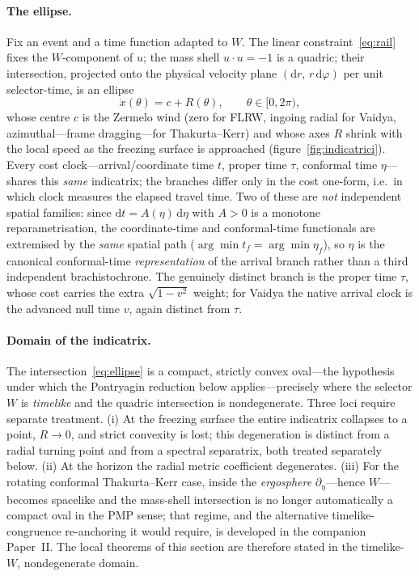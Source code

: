 \documentclass[12pt]{iopart}
\newcommand{\dd}{\mathrm{d}}
\theoremstyle{plain}
\theoremstyle{definition}
\theoremstyle{plain}
\theoremstyle{remark}
\begin{document}
\paragraph{The ellipse.} Fix an event and a time function adapted to $W$. The
linear constraint~\eqref{eq:rail} fixes the $W$-component of $u$; the mass shell
$u\cdot u=-1$ is a quadric; their intersection, projected onto the physical
velocity plane $(\dd r,\,r\,\dd\varphi)$ per unit selector-time, is an ellipse
\begin{equation}
    \dot x(\theta)=c+R(\theta),\qquad \theta\in[0,2\pi),
    \label{eq:ellipse}
\end{equation}
whose centre $c$ is the Zermelo wind (zero for FLRW, ingoing radial for Vaidya,
azimuthal---frame dragging---for Thakurta--Kerr) and whose axes $R$ shrink with
the local speed as the freezing surface is approached (figure~\ref{fig:indicatrici}).
Every cost clock---arrival/coordinate time $t$, proper time $\tau$, conformal time
$\eta$---shares this \emph{same} indicatrix; the branches differ only in the cost
one-form, i.e.\ in which clock measures the elapsed travel time. Two of these are
\emph{not} independent spatial families: since $\dd t=A(\eta)\,\dd\eta$ with $A>0$ is
a monotone reparametrisation, the coordinate-time and conformal-time functionals are
extremised by the \emph{same} spatial path ($\arg\min t_f=\arg\min\eta_f$), so $\eta$
is the canonical conformal-time \emph{representation} of the arrival branch rather
than a third independent brachistochrone. The genuinely distinct branch is the proper
time $\tau$, whose cost carries the extra $\sqrt{1-v^2}$ weight; for Vaidya the native
arrival clock is the advanced null time $v$, again distinct from $\tau$.

\paragraph{Domain of the indicatrix.} The intersection~\eqref{eq:ellipse} is a
compact, strictly convex oval---the hypothesis under which the Pontryagin reduction
below applies---precisely where the selector $W$ is \emph{timelike} and the quadric
intersection is nondegenerate. Three loci require separate treatment. (i) At the
freezing surface the entire indicatrix collapses to a point, $R\to0$, and strict
convexity is lost; this degeneration is distinct from a radial turning point and
from a spectral separatrix, both treated separately below. (ii) At the horizon the
radial metric coefficient degenerates. (iii) For the rotating conformal
Thakurta--Kerr case, inside the \emph{ergosphere} $\partial_\eta$---hence
$W$---becomes spacelike and the mass-shell intersection is no longer automatically a
compact oval in the PMP sense; that regime, and the alternative timelike-congruence
re-anchoring it would require, is developed in the companion Paper~II. The local
theorems of this section are therefore stated in the timelike-$W$, nondegenerate
domain.
\end{document}
